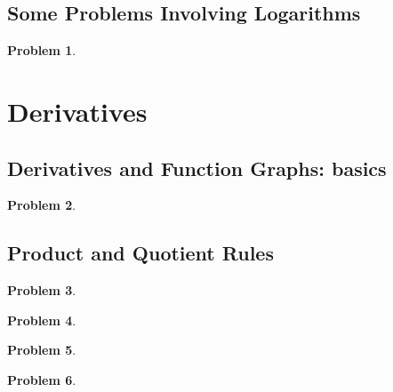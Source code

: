 \documentclass{article}
\newtheorem{problem}{Problem}
\begin{document}
\subsection{Some Problems Involving Logarithms}
\begin{problem}

\end{problem}





\section{Derivatives}
\subsection{Derivatives and Function Graphs: basics}\label{secMPSderivativesFunGraphsBasics}
\begin{problem}

\end{problem}
\subsection{Product and Quotient Rules}\label{secMPSproductQuotientRules}

\begin{problem}

\end{problem}


\begin{problem}

\end{problem}


\begin{problem}

\end{problem}


\begin{problem}

\end{problem}
\end{document}
